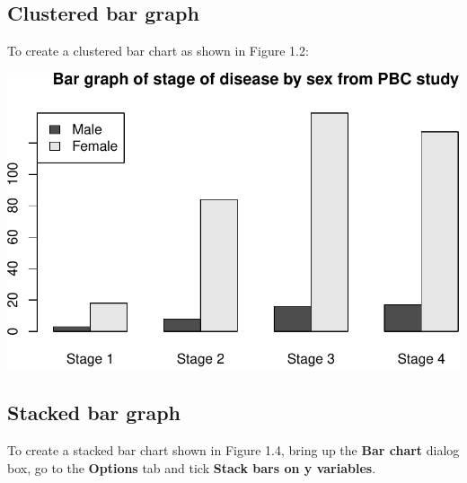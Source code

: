 \documentclass[
]{memoir}
\newenvironment{Shaded}{\begin{snugshade}}{\end{snugshade}}
\newcommand{\AttributeTok}[1]{\textcolor[rgb]{0.77,0.63,0.00}{#1}}
\newcommand{\ConstantTok}[1]{\textcolor[rgb]{0.00,0.00,0.00}{#1}}
\newcommand{\FunctionTok}[1]{\textcolor[rgb]{0.00,0.00,0.00}{#1}}
\newcommand{\NormalTok}[1]{#1}
\newcommand{\OtherTok}[1]{\textcolor[rgb]{0.56,0.35,0.01}{#1}}
\newcommand{\SpecialCharTok}[1]{\textcolor[rgb]{0.00,0.00,0.00}{#1}}
\newcommand{\StringTok}[1]{\textcolor[rgb]{0.31,0.60,0.02}{#1}}
\begin{document}
\hypertarget{clustered-bar-graph}{%
\subsection{Clustered bar graph}\label{clustered-bar-graph}}

To create a clustered bar chart as shown in Figure 1.2:

\begin{Shaded}
\end{Shaded}

\includegraphics{01-IntroToR_files/figure-latex/unnamed-chunk-35-1.pdf}

\hypertarget{stacked-bar-graph}{%
\subsection{Stacked bar graph}\label{stacked-bar-graph}}

To create a stacked bar chart shown in Figure 1.4, bring up the \textbf{Bar chart} dialog box, go to the \textbf{Options} tab and tick \textbf{Stack bars on y variables}.
\end{document}
